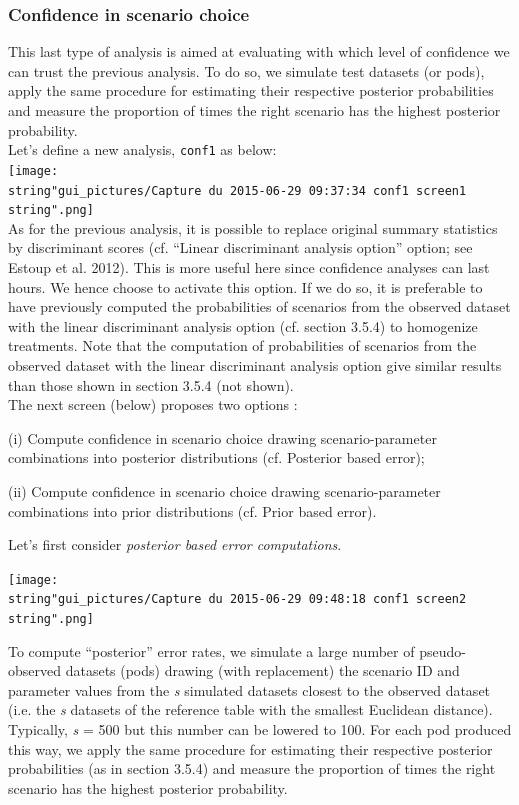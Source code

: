 \subsubsection{Confidence in scenario choice}

This last type of analysis is aimed at evaluating with which level
of confidence we can trust the previous analysis. To do so, we simulate
test datasets (or pods), apply the same procedure for estimating their
respective posterior probabilities and measure the proportion of times
the right scenario has the highest posterior probability.\\
 Let's define a new analysis, \texttt{conf1} as below:\\


\texttt{[image: \\string"gui\_pictures/Capture du 2015-06-29 09:37:34 conf1 screen1\\string".png]}\\


As for the previous analysis, it is possible to replace original summary
statistics by discriminant scores (cf. ``Linear discriminant analysis
option'' option; see Estoup et al. 2012). This is more useful here
since confidence analyses can last hours. We hence choose to activate
this option. If we do so, it is preferable to have previously computed
the probabilities of scenarios from the observed dataset with the
linear discriminant analysis option (cf. section 3.5.4) to homogenize
treatments. Note that the computation of probabilities of scenarios
from the observed dataset with the linear discriminant analysis option
give similar results than those shown in section 3.5.4 (not shown).
\\
 The next screen (below) proposes two options :

(i) Compute confidence in scenario choice drawing scenario-parameter
combinations into posterior distributions (cf. Posterior based error);

(ii) Compute confidence in scenario choice drawing scenario-parameter
combinations into prior distributions (cf. Prior based error).

Let's first consider \textit{posterior based error computations}.

\texttt{[image: \\string"gui\_pictures/Capture du 2015-06-29 09:48:18 conf1 screen2\\string".png]}

To compute \textquotedblleft{}posterior\textquotedblright{} error
rates, we simulate a large number of pseudo-observed datasets (pods)
drawing (with replacement) the scenario ID and parameter values from
the \textit{s} simulated datasets closest to the observed dataset
(i.e. the \textit{s} datasets of the reference table with the smallest
Euclidean distance). Typically, \textit{s }= 500 but this number can
be lowered to 100. For each pod produced this way, we apply the same
procedure for estimating their respective posterior probabilities
(as in section 3.5.4) and measure the proportion of times the right
scenario has the highest posterior probability.

